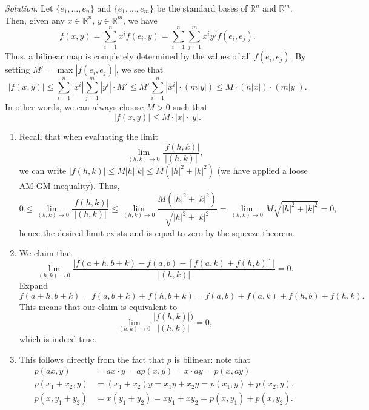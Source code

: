 \documentclass[11pt]{report}
\newcommand{\R}{\mathbb{R}}
\newcommand{\solution}{\noindent\textit{Solution.} }
\begin{document}
    \solution Let $\{e_1, \dots, e_n\}$ and $\{e_1, \dots, e_m\}$ be the standard
    bases of $\R^n$ and $\R^m$. Then, given any $x \in \R^n$, $y \in \R^m$, we have
    \[
        f(x, y) = \sum_{i = 1}^n x^if(e_i, y) = \sum_{i = 1}^n \sum_{j = 1}^m x^iy^j
        f(e_i, e_j).
    \] Thus, a bilinear map is completely determined by the values of all $f(e_i,
    e_j)$. By setting $M' = \max |f(e_i, e_j)|$, we see that \[
        |f(x, y)| \leq \sum_{i = 1}^n |x^i| \sum_{j = 1}^m |y^i| \cdot M' \leq M'
        \sum_{i = 1}^n |x^i| \cdot (m |y|) \leq M\cdot (n|x|)\cdot (m|y|).
    \] In other words, we can always choose $M > 0$ such that \[
        |f(x, y)| \leq M \cdot |x|\cdot |y|.
    \] 
    \begin{enumerate}
        \item Recall that when evaluating the limit \[
            \lim_{(h, k) \to 0} \frac{|f(h, k)|}{|(h, k)|},
        \] we can write $|f(h, k)| \leq M |h| |k| \leq M (|h|^2 + |k|^2)$ (we have
        applied a loose AM-GM inequality). Thus, \[
            0 \leq \lim_{(h, k) \to 0} \frac{|f(h, k)|}{|(h, k)|} \leq \lim_{(h, k)
            \to 0} \frac{M (|h|^2 + |k|^2)}{\sqrt{|h|^2 + |k|^2}} = \lim_{(h, k) \to
            0} M\sqrt{|h|^2 + |k|^2} = 0,
        \] hence the desired limit exists and is equal to zero by the squeeze
        theorem.

        \item We claim that \[
            \lim_{(h, k) \to 0} \frac{|f(a + h, b + k) - f(a, b) - [f(a, k) + f(h,
            b)]|}{|(h, k)|} = 0.
        \] Expand \[
            f(a + h, b + k) = f(a, b + k) + f(h, b + k) = f(a, b) + f(a, k) + f(h, b)
            + f(h, k).
        \] This means that our claim is equivalent to \[
            \lim_{(h, k) \to 0} \frac{|f(h, k)|)}{|(h, k)|} = 0,
        \] which is indeed true.

        \item This follows directly from the fact that $p$ is bilinear: note that
        \begin{align*}
            p(ax, y) &= ax\cdot y = a p(x, y) = x\cdot ay = p(x, ay) \\
            p(x_1 + x_2, y) &= (x_1 + x_2) y = x_1y + x_2y = p(x_1, y) + p(x_2, y), \\
            p(x, y_1 + y_2) &= x(y_1 + y_2) = xy_1 + xy_2 = p(x, y_1) + p(x, y_2).
        \end{align*}
    \end{enumerate}
\end{document}
